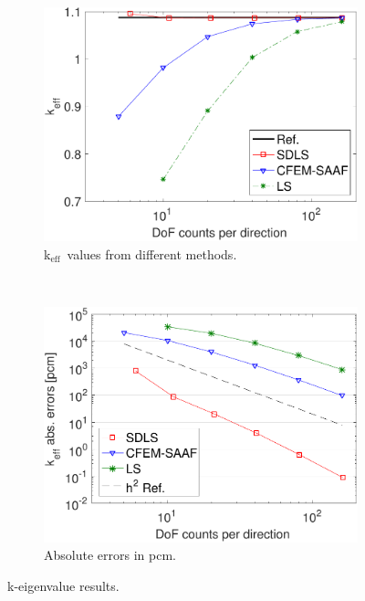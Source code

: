 \documentclass[review]{elsarticle}
\begin{document}
\begin{figure}[ht!]
	\begin{subfigure}{.5\textwidth}
		\centering
		\hspace*{-2cm}\includegraphics[width=1.1\linewidth]{cdls-eigen}
		\caption{k$_\mathrm{eff}$\ values from different methods.}
		\label{f:k}
	\end{subfigure}
	~
	\begin{subfigure}{.5\textwidth}
		\centering
		\hspace*{-0cm}\includegraphics[width=1.1\linewidth]{cdls-eigen-error}
		\caption{Absolute errors in pcm.}
		\label{f:k-err}
	\end{subfigure}
	\caption{k-eigenvalue results.}
	\label{f:eigen}
\end{figure}
\end{document}
